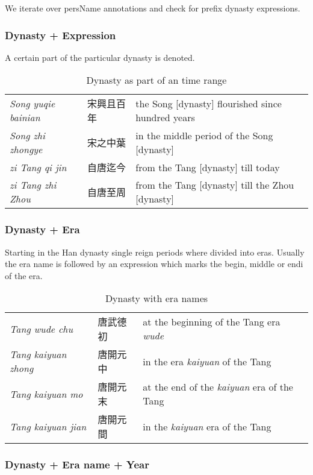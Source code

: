 \documentclass[12pt, draft]{article}
\begin{document}
We iterate over persName annotations and check for prefix dynasty expressions.

\subsubsection{Dynasty + Expression}
A certain part of the particular dynasty is denoted.

{\footnotesize
\begin{table}[h]
\caption{Dynasty as part of an time range}
\begin{tabular}{lll}
\emph{Song yuqie bainian} & 宋興且百年 & the Song [dynasty] flourished since hundred years \\
\emph{Song zhi zhongye} & 宋之中葉 & in the middle period of the Song [dynasty] \\
\emph{zi Tang qi jin} & 自唐迄今 & from the Tang [dynasty] till today \\
\emph{zi Tang zhi Zhou} & 自唐至周 & from the Tang [dynasty] till the Zhou [dynasty] \\
\end{tabular}
\end{table}
}

\subsubsection{Dynasty + Era}

Starting in the Han dynasty single reign periods where divided
into eras.  Usually the era name is followed by an expression
which marks the begin, middle or endi of the era.

{\footnotesize
\begin{table}[h]
\caption{Dynasty with era names}
\begin{tabular}{lll}
\hline
\emph{Tang wude chu} & 唐武德初 & at the beginning of the Tang era \emph{wude} \\
\emph{Tang kaiyuan zhong } & 唐開元中 & in the era \emph{kaiyuan} of the Tang \\
\emph{Tang kaiyuan mo} & 唐開元末 & at the end of the \emph{kaiyuan} era of the Tang \\
\emph{Tang kaiyuan jian} & 唐開元間 & in the \emph{kaiyuan} era of the Tang \\
\end{tabular}
\end{table}
}

\subsubsection{Dynasty + Era name + Year}
\end{document}
